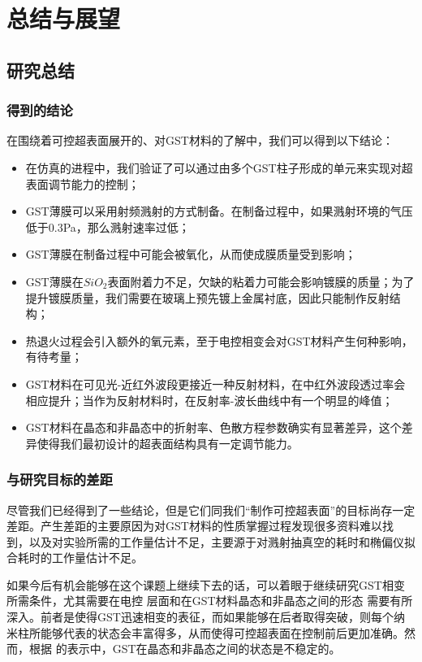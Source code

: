 \chapter{总结与展望}
\label{chap:04}

\section{研究总结}
\label{conclusion}

\subsection{得到的结论}
在围绕着可控超表面展开的、对GST材料的了解中，我们可以得到以下结论：
\begin{itemize}
	\item 在仿真的进程中，我们验证了可以通过由多个GST柱子形成的单元来实现对超表面调节能力的控制；
	\item GST薄膜可以采用射频溅射的方式制备。在制备过程中，如果溅射环境的气压低于0.3Pa，那么溅射速率过低；
	\item GST薄膜在制备过程中可能会被氧化，从而使成膜质量受到影响；
	\item GST薄膜在$SiO_{2}$表面附着力不足，欠缺的粘着力可能会影响镀膜的质量；为了提升镀膜质量，我们需要在玻璃上预先镀上金属衬底，因此只能制作反射结构；
	\item 热退火过程会引入额外的氧元素，至于电控相变会对GST材料产生何种影响，有待考量；
	\item GST材料在可见光-近红外波段更接近一种反射材料，在中红外波段透过率会相应提升；当作为反射材料时，在反射率-波长曲线中有一个明显的峰值；
	\item GST材料在晶态和非晶态中的折射率、色散方程参数确实有显著差异，这个差异使得我们最初设计的超表面结构具有一定调节能力。
\end{itemize}

\subsection{与研究目标的差距}
\label{sub:disappointments}
尽管我们已经得到了一些结论，但是它们同我们“制作可控超表面”的目标尚存一定差距。产生差距的主要原因为对GST材料的性质掌握过程发现很多资料难以找到，以及对实验所需的工作量估计不足，主要源于对溅射抽真空的耗时和椭偏仪拟合耗时的工作量估计不足。

如果今后有机会能够在这个课题上继续下去的话，可以着眼于继续研究GST相变所需条件，尤其需要在电控 \cite{nature1} 层面和在GST材料晶态和非晶态之间的形态 \cite{middle} 需要有所深入。前者是使得GST迅速相变的表征，而如果能够在后者取得突破，则每个纳米柱所能够代表的状态会丰富得多，从而使得可控超表面在控制前后更加准确。然而，根据 \cite{nature2} 的表示中，GST在晶态和非晶态之间的状态是不稳定的。


